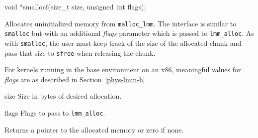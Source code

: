 \label{smallocf}
\begin{apisyn}

	\funcproto void *smallocf(size_t size, unsigned~int flags);
\end{apisyn}
\begin{apidesc}
	Allocates uninitialized memory from {\tt malloc_lmm}.
	The interface is similar to {\tt smalloc} but with an additional
	\emph{flags} parameter which is passed to {\tt lmm_alloc}.
	As with {\tt smalloc},
	the user must keep track of the size of the allocated chunk
	and pass that size to \texttt{sfree} when releasing the chunk.
	
	For kernels running in the base environment on an x86,
	meaningful values for \emph{flags} are as described in
	Section~\ref{phys-lmm-h}.
\end{apidesc}
\begin{apiparm}
	\item[size]
		Size in bytes of desired allocation.
	\item[flags]
		Flags to pass to {\tt lmm_alloc}.
\end{apiparm}
\begin{apiret}
	Returns a pointer to the allocated memory or zero if none.
\end{apiret}

